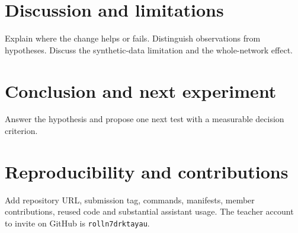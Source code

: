 \documentclass[preprint,11pt,a4paper]{elsarticle}
\begin{document}
\section{Discussion and limitations}
Explain where the change helps or fails. Distinguish observations from hypotheses. Discuss the synthetic-data limitation and the whole-network effect.
\section{Conclusion and next experiment}
Answer the hypothesis and propose one next test with a measurable decision criterion.
\section*{Reproducibility and contributions}
Add repository URL, submission tag, commands, manifests, member contributions, reused code and substantial assistant usage. The teacher account to invite on GitHub is \texttt{rolln7drktayau}.


\end{document}
